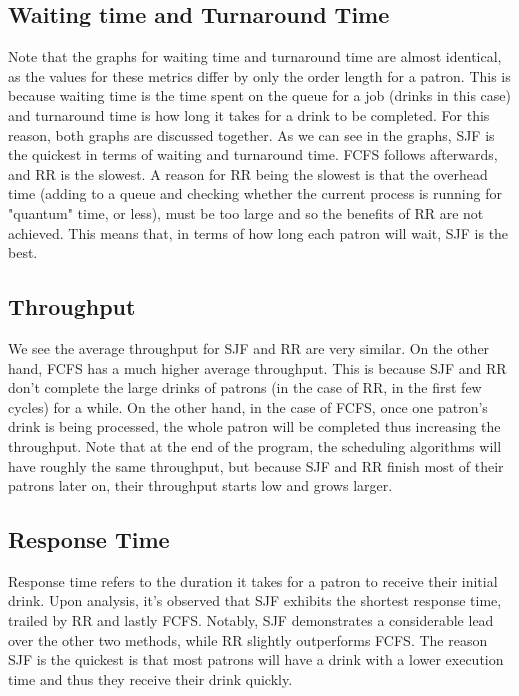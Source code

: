 \documentclass{assignment}
\begin{document}
\subsection{Waiting time and Turnaround Time}
Note that the graphs for waiting time and turnaround time are almost identical, as the values for these metrics differ by only the order length for a patron. This is because waiting time is the time spent on the queue for a job (drinks in this case) and turnaround time is how long it takes for a drink to be completed. For this reason, both graphs are discussed together.
As we can see in the graphs, SJF is the quickest in terms of waiting and turnaround time. FCFS follows afterwards, and RR is the slowest. A reason for RR being the slowest is that the overhead time (adding to a queue and checking whether the current process is running for "quantum" time, or less), must be too large and so the benefits of RR are not achieved. This means that, in terms of how long each patron will wait, SJF is the best.
\subsection{Throughput}
We see the average throughput for SJF and RR are very similar. On the other hand, FCFS has a much higher average throughput. This is because SJF and RR don't complete the large drinks of patrons (in the case of RR, in the first few cycles) for a while. On the other hand, in the case of FCFS, once one patron's drink is being processed, the whole patron will be completed thus increasing the throughput. Note that at the end of the program, the scheduling algorithms will have roughly the same throughput, but because SJF and RR finish most of their patrons later on, their throughput starts low and grows larger.
\subsection{Response Time}
Response time refers to the duration it takes for a patron to receive their initial drink. Upon analysis, it's observed that SJF exhibits the shortest response time, trailed by RR and lastly FCFS. Notably, SJF demonstrates a considerable lead over the other two methods, while RR slightly outperforms FCFS. The reason SJF is the quickest is that most patrons will have a drink with a lower execution time and thus they receive their drink quickly.
\end{document}
